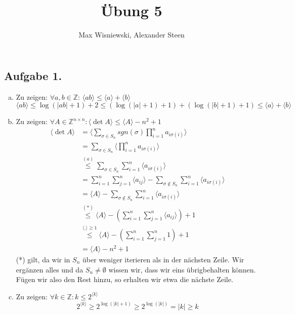 \documentclass[11pt,a4paper,ngerman]{article}
\date{}
\title{Übung 5}
\author{Max Wisniewski, Alexander Steen}
\newcommand{\code}[1]{\langle {#1} \rangle}
\newcommand{\Z}{\mathbb{Z}}
\begin{document}

\renewcommand{\figurename}{Figure}

\maketitle
\thispagestyle{fancy}

\subsection*{Aufgabe 1.}
\begin{enumerate}[a)]
\item Zu zeigen: $\forall a,b \in \Z: \, \code{ab} \leq \code{a} + \code{b}$ 
\begin{equation*}
 \code{ab} \leq \log(|ab| + 1)+2 \leq (\log(|a|+1)+1) + (\log(|b|+1)+1) \leq \code{a} + \code{b}
\end{equation*}
\item Zu zeigen: $\forall A \in \Z^{n \times n}: \code{\det A} \leq \code{A} - n^2 + 1$
\begin{equation*}\begin{split}
\code{\det A} &= \code{\sum_{\sigma \in S_n} {sgn(\sigma) \prod_{i=1}^n a_{i \sigma(i)}}} \\
 &= \sum_{\sigma \in S_n} \code{{\prod_{i=1}^n a_{i \sigma(i)}}} \\
  &\stackrel{(a)}{\leq} \sum_{\sigma \in S_n} \sum_{i=1}^n \code{{a_{i \sigma(i)}}} \\
  &= \sum_{i=1}^n \sum_{j=1}^n \code{a_{ij}} - \sum_{\sigma \notin S_n} \sum_{i=1}^n \code{{a_{i \sigma(i)}}} \\
  &= \code{A} - \sum_{\sigma \notin S_n} \sum_{i=1}^n \code{{a_{i \sigma(i)}}} \\
  &\stackrel{(*)}{\leq} \code{A} - \left( \sum_{i=1}^n \sum_{j=1}^n \code{a_{ij}} \right) +1 \\
  &\stackrel{\code{.} \geq 1}{\leq} \code{A} - \left( \sum_{i=1}^n \sum_{j=1}^n 1 \right) +1 \\
  &= \code{A} - n^2 + 1
\end{split}\end{equation*}
(*) gilt, da wir in $S_n$ über weniger iterieren als in der nächsten Zeile. Wir ergänzen alles
  und da $S_n \not= \emptyset$ wissen wir, dass wir eins übrigbehalten können. Fügen wir also
  den Rest hinzu, so erhalten wir etwa die nächste Zeile.
\item Zu zeigen: $\forall k \in \Z: k \leq 2^{\code{k}}$ \\
\begin{equation*}
2^{\code{k}} \geq 2^{\log(|k| + 1)} \geq 2^{\log(|k|)} = |k| \geq k
\end{equation*}
\end{enumerate}
\end{document}
